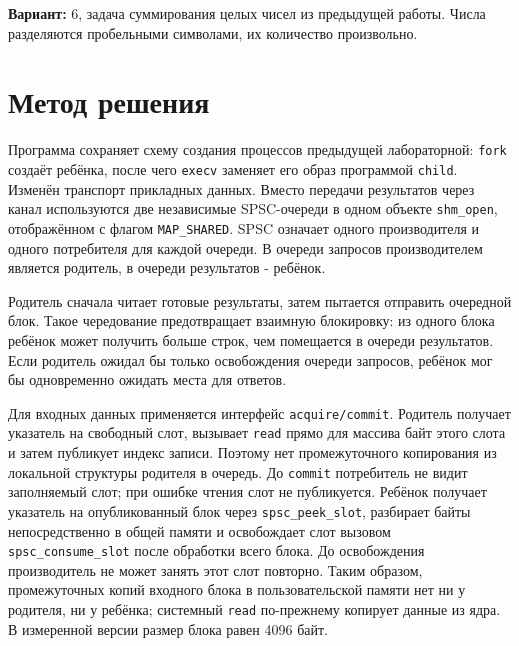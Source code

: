 \documentclass[12pt,a4paper,oneside,fleqn]{article}
\begin{document}
\textbf{Вариант:} 6, задача суммирования целых чисел из предыдущей работы.
Числа разделяются пробельными символами, их количество произвольно.

\section{Метод решения}
Программа сохраняет схему создания процессов предыдущей лабораторной:
\texttt{fork} создаёт ребёнка, после чего \texttt{execv} заменяет его образ
программой \texttt{child}. Изменён транспорт прикладных данных. Вместо передачи
результатов через канал используются две независимые SPSC-очереди в одном
объекте \texttt{shm\_open}, отображённом с флагом \texttt{MAP\_SHARED}.
SPSC означает одного производителя и одного потребителя для каждой очереди.
В очереди запросов производителем является родитель, в очереди результатов - ребёнок.

\begin{center}
\end{center}

Родитель сначала читает готовые результаты, затем пытается отправить очередной
блок. Такое чередование предотвращает взаимную блокировку: из одного блока
ребёнок может получить больше строк, чем помещается в очереди результатов.
Если родитель ожидал бы только освобождения очереди запросов, ребёнок мог бы
одновременно ожидать места для ответов.

Для входных данных применяется интерфейс \texttt{acquire/commit}. Родитель
получает указатель на свободный слот, вызывает \texttt{read} прямо для массива
байт этого слота и затем публикует индекс записи. Поэтому нет промежуточного
копирования из локальной структуры родителя в очередь. До \texttt{commit}
потребитель не видит заполняемый слот; при ошибке чтения слот не публикуется.
Ребёнок получает указатель на опубликованный блок через
\texttt{spsc\_peek\_slot}, разбирает байты непосредственно в общей памяти и
освобождает слот вызовом \texttt{spsc\_consume\_slot} после обработки всего блока.
До освобождения производитель не может занять этот слот повторно.
Таким образом, промежуточных копий входного блока в пользовательской памяти
нет ни у родителя, ни у ребёнка; системный \texttt{read} по-прежнему копирует
данные из ядра. В измеренной версии размер блока равен 4096 байт.
\end{document}
